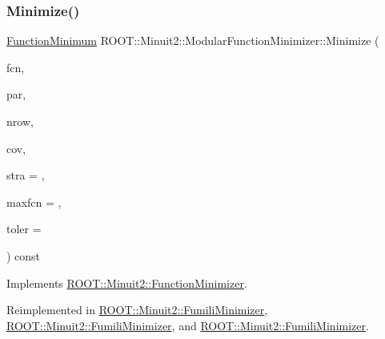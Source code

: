 \subsubsection{\texorpdfstring{Minimize()}{Minimize()}\hspace{0.1cm}{\footnotesize\ttfamily [8/33]}}
{\footnotesize\ttfamily \mbox{\hyperlink{classROOT_1_1Minuit2_1_1FunctionMinimum}{Function\+Minimum}} R\+O\+O\+T\+::\+Minuit2\+::\+Modular\+Function\+Minimizer\+::\+Minimize (\begin{DoxyParamCaption}\item[{const \mbox{\hyperlink{classROOT_1_1Minuit2_1_1FCNBase}{F\+C\+N\+Base}} \&}]{fcn,  }\item[{const std\+::vector$<$ double $>$ \&}]{par,  }\item[{unsigned int}]{nrow,  }\item[{const std\+::vector$<$ double $>$ \&}]{cov,  }\item[{unsigned int}]{stra = {},  }\item[{unsigned int}]{maxfcn = {},  }\item[{double}]{toler = {} }\end{DoxyParamCaption}) const\hspace{0.3cm}{\ttfamily [virtual]}}



Implements \mbox{\hyperlink{classROOT_1_1Minuit2_1_1FunctionMinimizer_a22d44dc8c018424a98ce8928ee7c5613}{R\+O\+O\+T\+::\+Minuit2\+::\+Function\+Minimizer}}.



Reimplemented in \mbox{\hyperlink{classROOT_1_1Minuit2_1_1FumiliMinimizer_ac2cff69bc8ac1702179b9e17288095a8}{R\+O\+O\+T\+::\+Minuit2\+::\+Fumili\+Minimizer}}, \mbox{\hyperlink{classROOT_1_1Minuit2_1_1FumiliMinimizer_ac2cff69bc8ac1702179b9e17288095a8}{R\+O\+O\+T\+::\+Minuit2\+::\+Fumili\+Minimizer}}, and \mbox{\hyperlink{classROOT_1_1Minuit2_1_1FumiliMinimizer_ac2cff69bc8ac1702179b9e17288095a8}{R\+O\+O\+T\+::\+Minuit2\+::\+Fumili\+Minimizer}}.

